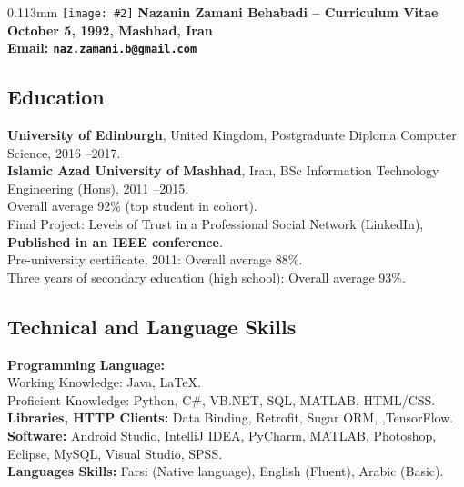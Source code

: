 \documentclass[10pt]{article}
\newcommand{\imagetext}[3][0.11]{%
\begin{imagetextbox}[]{#1\textwidth}{3mm}%
  \texttt{[image: \#2]}%
  \tcblower%
   #3%
\end{imagetextbox}}
\begin{document}
\imagetext{1.jpg}{\Large\bf Nazanin Zamani Behabadi -- \textcolor{ green!50!red}{Curriculum Vitae} \\ \normalsize October 5, 1992, Mashhad, Iran \\ \normalsize Email: \texttt{naz.zamani.b@gmail.com}}
\thispagestyle{empty}

\subsection*{Education}
\noindent \textbf{University of Edinburgh}, United Kingdom, Postgraduate Diploma Computer Science, 2016 --2017.\vspace{1mm}\\
\noindent \textbf{Islamic Azad University of Mashhad}, Iran, BSc Information Technology Engineering (Hons), 2011 --2015. \\
\indent Overall average 92\%  (top student in cohort).\\
\indent Final Project: Levels of Trust in a Professional Social Network (LinkedIn), \textbf {Published in an IEEE conference}.\vspace{1mm}\\
\noindent Pre-university certificate, 2011: Overall average  88\%. \\
\noindent Three years of secondary education (high school): Overall average  93\%.

\subsection*{Technical and Language Skills}

\noindent \textbf{Programming Language:} \vspace{0.5mm}\\
Working Knowledge: Java,  \LaTeX.\\
Proficient Knowledge:  Python, C\#, VB.NET, SQL, MATLAB, HTML/CSS.\vspace{1mm}\\
\noindent \textbf{Libraries, HTTP Clients:}  Data Binding, Retrofit, Sugar ORM, ,TensorFlow.\vspace{1mm}\\
\noindent \textbf{Software:} Android Studio, IntelliJ IDEA, PyCharm, MATLAB, Photoshop, Eclipse, MySQL, Visual Studio, SPSS.\vspace{1mm}\\
\noindent \textbf{Languages Skills: }Farsi (Native language), English (Fluent), Arabic (Basic).
\end{document}
